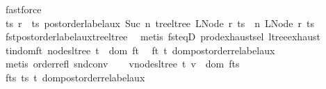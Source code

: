 \begin{isabellebody}
\ fastforce\isanewline
\ \ \isamarkupfalse%
\ \isamarkupfalse%
\ ts{\isacharprime}{\kern0pt}\ r{\isacharprime}{\kern0pt}\ \ ts{\isacharprime}{\kern0pt}{\isacharcolon}{\kern0pt}\ {\isachardoublequoteopen}postorder{\isacharunderscore}{\kern0pt}label{\isacharunderscore}{\kern0pt}aux\ {\isacharparenleft}{\kern0pt}Suc\ n{\isacharprime}{\kern0pt}{\isacharparenright}{\kern0pt}\ {\isacharparenleft}{\kern0pt}tree{\isacharunderscore}{\kern0pt}ltree\ {\isacharparenleft}{\kern0pt}LNode\ r\ ts{\isacharparenright}{\kern0pt}{\isacharparenright}{\kern0pt}\ {\isacharequal}{\kern0pt}\ {\isacharparenleft}{\kern0pt}n{\isacharprime}{\kern0pt}{\isacharprime}{\kern0pt}{\isacharcomma}{\kern0pt}\ LNode\ r{\isacharprime}{\kern0pt}\ ts{\isacharprime}{\kern0pt}{\isacharparenright}{\kern0pt}{\isachardoublequoteclose}\isanewline
\ \ \ \ \isamarkupfalse%
\ fst{\isacharunderscore}{\kern0pt}postorder{\isacharunderscore}{\kern0pt}label{\isacharunderscore}{\kern0pt}aux{\isacharunderscore}{\kern0pt}tree{\isacharunderscore}{\kern0pt}ltree\ \isamarkupfalse%
\ {\isacharparenleft}{\kern0pt}metis\ fst{\isacharunderscore}{\kern0pt}eqD\ prod{\isachardot}{\kern0pt}exhaust{\isacharunderscore}{\kern0pt}sel\ ltree{\isachardot}{\kern0pt}exhaust{\isacharparenright}{\kern0pt}\isanewline
\isanewline
\ \ \isamarkupfalse%
\ t{\isacharprime}{\kern0pt}{\isacharunderscore}{\kern0pt}in{\isacharunderscore}{\kern0pt}dom{\isacharunderscore}{\kern0pt}f{\isacharunderscore}{\kern0pt}t{\isacharcolon}{\kern0pt}\ {\isachardoublequoteopen}nodes{\isacharunderscore}{\kern0pt}ltree\ t{\isacharprime}{\kern0pt}\ {\isasymsubseteq}\ dom\ f{\isacharunderscore}{\kern0pt}t{\isachardoublequoteclose}\ \isamarkupfalse%
\ f{\isacharunderscore}{\kern0pt}t\ t{\isacharprime}{\kern0pt}\ dom{\isacharunderscore}{\kern0pt}postorder{\isacharunderscore}{\kern0pt}relabel{\isacharunderscore}{\kern0pt}aux\isanewline
\ \ \ \ \isamarkupfalse%
\ {\isacharparenleft}{\kern0pt}metis\ order{\isacharunderscore}{\kern0pt}refl\ snd{\isacharunderscore}{\kern0pt}conv{\isacharparenright}{\kern0pt}\isanewline
\ \ \isamarkupfalse%
\ {\isachardoublequoteopen}{\isasymforall}v{\isasymin}nodes{\isacharunderscore}{\kern0pt}ltree\ t{\isacharprime}{\kern0pt}{\isachardot}{\kern0pt}\ v\ {\isasymnotin}\ dom\ f{\isacharunderscore}{\kern0pt}ts{\isachardoublequoteclose}\ \isamarkupfalse%
\ f{\isacharunderscore}{\kern0pt}ts\ ts{\isacharprime}{\kern0pt}\ t{\isacharprime}{\kern0pt}\ dom{\isacharunderscore}{\kern0pt}postorder{\isacharunderscore}{\kern0pt}relabel{\isacharunderscore}{\kern0pt}aux\isanewline

\end{isabellebody}
